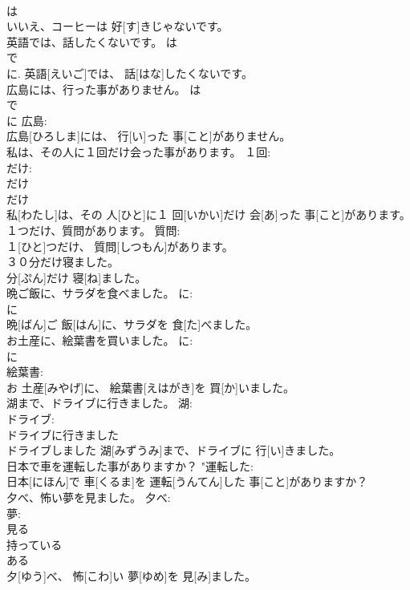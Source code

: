 \documentclass[8pt]{extreport}
\begin{document}
\begin{CJK}{UTF8}{min}
\\	は 
\\	いいえ、コーヒーは 好[す]きじゃないです。	
\\	英語では、話したくないです。	は 
\\	で 
\\	に.	英語[えいご]では、 話[はな]したくないです。	
\\	広島には、行った事がありません。	は 
\\	で 
\\	に 広島: 
\\	広島[ひろしま]には、 行[い]った 事[こと]がありません。	
\\	私は、その人に１回だけ会った事があります。	１回: 
\\	だけ: 
\\	だけ 
\\	だけ 
\\	私[わたし]は、その 人[ひと]に１ 回[いかい]だけ 会[あ]った 事[こと]があります。	
\\	１つだけ、質問があります。	質問: 
\\	１[ひと]つだけ、 質問[しつもん]があります。	
\\	３０分だけ寝ました。	
\\	分[ぷん]だけ 寝[ね]ました。	
\\	晩ご飯に、サラダを食べました。	に: 
\\	に 
\\	晩[ばん]ご 飯[はん]に、サラダを 食[た]べました。	
\\	お土産に、絵葉書を買いました。	に: 
\\	に 
\\	絵葉書: 
\\	お 土産[みやげ]に、 絵葉書[えはがき]を 買[か]いました。	
\\	湖まで、ドライブに行きました。	湖: 
\\	ドライブ: 
\\	ドライブに行きました 
\\	ドライブしました	湖[みずうみ]まで、ドライブに 行[い]きました。		
\\	日本で車を運転した事がありますか？	"運転した: 
\\	日本[にほん]で 車[くるま]を 運転[うんてん]した 事[こと]がありますか？	
\\	夕べ、怖い夢を見ました。	夕べ: 
\\	夢: 
\\	見る 
\\	持っている 
\\	ある 
\\	夕[ゆう]べ、 怖[こわ]い 夢[ゆめ]を 見[み]ました。		

\end{CJK}
\end{document}
